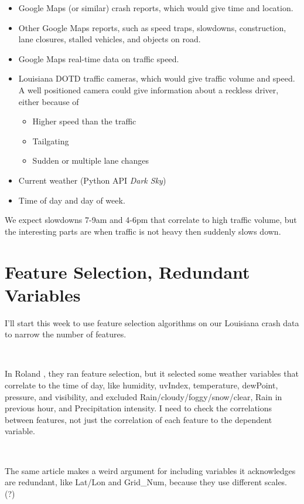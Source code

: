 \documentclass[11pt]{article}
\begin{document}
\begin{spacing}{1.2}
\begin{itemize}
	\item Google Maps (or similar) crash reports, which would give time and location.
	\item Other Google Maps reports, such as speed traps, slowdowns, construction, lane closures, stalled vehicles, and objects on road.
	\item Google Maps real-time data on traffic speed.
	\item Louisiana DOTD traffic cameras, which would give traffic volume and speed.  A well positioned camera could give information about a reckless driver, either because of 
	\begin {itemize}
		\item Higher speed than the traffic
		\item Tailgating
		\item Sudden or multiple lane changes
	\end{itemize}
	\item Current weather (Python API {\it Dark Sky})
	\item Time of day and day of week.
\end{itemize}

We expect slowdowns 7-9am and 4-6pm that correlate to high traffic volume, but the interesting parts are when traffic is not heavy then suddenly slows down.  

\section{Feature Selection, Redundant Variables}

I'll start this week to use feature selection algorithms on our Louisiana crash data to narrow the number of features.  

\

In Roland \cite{ ROLAND2021105860}, they ran feature selection, but it selected some weather variables that correlate to the time of day, like humidity, uvIndex, temperature, dewPoint, pressure, and visibility, and excluded Rain/cloudy/foggy/snow/clear, Rain in previous hour, and Precipitation intensity.  I need to check the correlations between features, not just the correlation of each feature to the dependent variable.  

\

The same article makes a weird argument for including variables it acknowledges are redundant, like Lat/Lon and Grid\_Num, because they use different scales.  (?)


\end{spacing}
\end{document}
